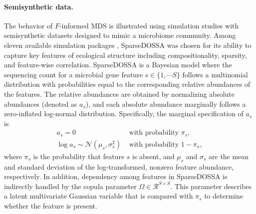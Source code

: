 \documentclass[10pt,letterpaper]{article}
\newcommand{\1}{{\rm 1}\kern-0.24em{\rm I}}
\newcommand{\cR}{\mathcal{R}}
\newcommand{\cN}{\mathcal{N}}
\begin{document}
\paragraph*{Semisynthetic data.}
The behavior of $F$-informed MDS is illustrated using simulation studies with semisynthetic datasets designed to mimic a microbiome community. Among eleven available simulation packages \cite{Sankaran25}, SparseDOSSA \cite{Ma21} was chosen for its ability to capture key features of ecological structure including compositionality, sparsity, and feature-wise correlation. SparseDOSSA is a Bayesian model where the sequencing count for a microbial gene feature $s\in\{1,\cdots S\}$ follows a multinomial distribution with probabilities equal to the corresponding relative abundances of the features. The relative abundances are obtained by normalizing absolute abundances (denoted as $a_s$), and each absolute abundance marginally follows a zero-inflated log-normal distribution. Specifically, the marginal specification of $a_s$ is
\begin{equation}
\begin{aligned}
    a_s = 0 \qquad &\text{ with probability } \pi_s, \\
    \log a_s \sim \cN (\mu_s, \sigma_s^2) &\text{ with probability } 1-\pi_s,
\end{aligned}
\end{equation}
where $\pi_s$ is the probability that feature $s$ is absent, and $\mu_s$ and $\sigma_s$ are the mean and standard deviation of the log-transformed, nonzero feature abundance, respectively. In addition, dependency among features in SparseDOSSA is indirectly handled by the copula parameter $\Omega\in\cR^{S\times S}$. This parameter describes a latent multivariate Gaussian variable that is compared with $\pi_s$ to determine whether the feature is present.
\end{document}
